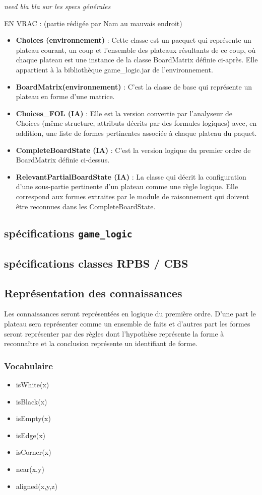 \emph{need bla bla sur les specs générales}

EN VRAC :
(partie rédigée par Nam au mauvais endroit)

\begin{itemize}
  \item \textbf {\gls{Choices} (environnement)} : Cette classe est un pacquet qui représente un plateau courant, un coup et l'ensemble des plateaux résultants de ce coup, où chaque plateau est une instance de la classe \gls{BoardMatrix} définie ci-après. Elle appartient à la bibliothèque game\_logic.jar de l'environnement.
  \item \textbf {\gls{BoardMatrix}(environnement)} : C'est la classe de base qui représente un plateau en forme d'une matrice. 
  \item \textbf {\gls{Choices_FOL} (IA)} : Elle est la version convertie par l'analyseur de Choices (même structure, attributs décrits par des formules logiques) avec, en addition, une liste de formes pertinentes associée à chaque plateau du paquet.
  \item \textbf {\gls{CompleteBoardState} (IA)} : C'est la version logique du premier ordre de
  \gls{BoardMatrix} définie ci-dessus.
  \item \textbf {\gls{RelevantPartialBoardState} (IA)} : La classe qui décrit la configuration d'une sous-partie pertinente d'un plateau comme une règle logique. Elle correspond aux \og formes \fg{} extraites par le module de raisonnement qui doivent être reconnues dans les \gls{CompleteBoardState}.
\end{itemize}

\subsection{spécifications \texttt{\gls{game_logic}}}
\label{specs_game_logic}
\subsection{spécifications classes RPBS / CBS}
\label{specs_shared_classes}
\subsection{Représentation des connaissances}
	Les connaissances seront représentées en logique du première ordre. D'une part le plateau sera représenter comme un ensemble de faits et d'autres part les \og formes \fg{} seront représenter par des règles dont l'hypothèse représente la forme à reconnaître et la conclusion représente un identifiant de forme.
	
	\subsubsection{Vocabulaire} 
	\begin{itemize}
	\item isWhite(x)
  \item isBlack(x)
  \item isEmpty(x)
  \item isEdge(x)
  \item isCorner(x)
  \item near(x,y)
  \item aligned(x,y,z)
	\end{itemize}

\label{specs_voc_fol}